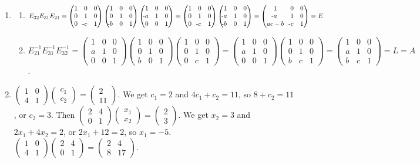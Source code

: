 \documentclass[11pt,twoside]{article}
\newcommand{\bpm}{\begin{pmatrix}}
\newcommand{\epm}{\end{pmatrix}}
\newcommand{\mn}{\llap{-}}
\begin{document}
\begin{enumerate}
\item[8.]\begin{enumerate}
\item  $E_{32}E_{31}E_{21} = \bpm 1&0&0\\ 0&1&0 \\ 0&\mn c&1\epm\bpm 1&0&0\\ 0&1&0 \\ \mn b&0&1\epm \bpm 1&0&0\\ \mn a&1&0 \\ 0&0&1\epm = \bpm 1&0&0\\ 0&1&0 \\ 0&\mn c&1\epm\bpm 1 & 0 & 0 \\ \mn a & 1 & 0 \\ \mn b & 0 & 1\epm = \bpm 1 & 0 & 0 \\ \mn a & 1 & 0 \\ ac-b & \mn c& 1\epm  = E$\\ 
\item $E_{21}^{-1}E_{31}^{-1}E_{32}^{-1} = \bpm 1&0&0\\ a&1&0 \\ 0&0&1\epm\bpm 1&0&0\\ 0&1&0 \\ b&0&1\epm \bpm 1&0&0\\  0&1&0 \\ 0&c&1\epm = \bpm 1&0&0\\ a&1&0 \\ 0&0&1\epm\bpm 1 & 0 & 0 \\ 0 & 1 & 0 \\ b & c & 1\epm  = \bpm 1&0&0\\ a&1&0 \\ b&c&1\epm = L = A$.
\end{enumerate}

\item[15.] $\bpm 1 & 0 \\ 4 & 1 \epm \bpm c_1 \\ c_2 \epm = \bpm 2 \\ 11\epm$. We get $c_1 = 2$ and $4c_1 + c_2 = 11$, so $8+c_2=11$, or $c_2=3$. Then $\bpm 2 & 4 \\ 0 & 1\epm \bpm x_1 \\ x_2 \epm = \bpm 2 \\ 3\epm$. We get $x_2 = 3$ and $2x_1 + 4x_2 = 2$, or $2x_1 + 12 = 2$, so $x_1 = -5$.\\

$\bpm 1 & 0 \\ 4 & 1 \epm \bpm 2 & 4 \\ 0 & 1\epm = \bpm 2 & 4 \\ 8 & 17 \epm$.\\


\end{enumerate}
\end{document}
